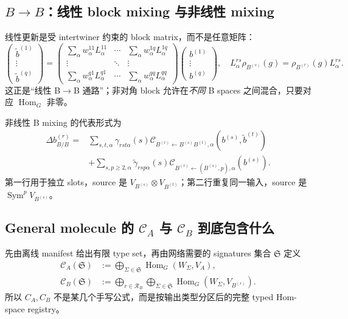 \documentclass[11pt,a4paper,fontset=fandol]{ctexart}
\newcommand{\Sym}{\operatorname{Sym}}
\newcommand{\Hom}{\operatorname{Hom}}
\newcommand{\cA}{\mathcal C_A}
\newcommand{\cB}{\mathcal C_B}
\begin{document}
\subsection{$B\to B$：线性 block mixing 与非线性 mixing}

线性更新是受 intertwiner 约束的 block matrix，而不是任意矩阵：
\begin{equation}
  \begin{pmatrix}
    \widetilde b^{(1)}\\[-.2em]\vdots\\[-.2em]\widetilde b^{(q)}
  \end{pmatrix}
  =
  \begin{pmatrix}
    \sum_\alpha w^{11}_\alpha L^{11}_\alpha&\cdots&\sum_\alpha w^{1q}_\alpha L^{1q}_\alpha\\
    \vdots&\ddots&\vdots\\
    \sum_\alpha w^{q1}_\alpha L^{q1}_\alpha&\cdots&\sum_\alpha w^{qq}_\alpha L^{qq}_\alpha
  \end{pmatrix}
  \begin{pmatrix}
    b^{(1)}\\[-.2em]\vdots\\[-.2em]b^{(q)}
  \end{pmatrix},
  \quad
  L^{rs}_\alpha\rho_{B^{(s)}}(g)
  =\rho_{B^{(r)}}(g)L^{rs}_\alpha.
  \label{eq:linear-b-b}
\end{equation}
这正是“线性 B$\to$B 通路”；非对角 block 允许在\emph{不同} B spaces 之间混合，只要对应 $\Hom_G$ 非零。

非线性 B mixing 的代表形式为
\begin{align}
  \Delta b^{(r)}_{B/B}
  =&\sum_{s,t,\alpha}
  \gamma_{rst\alpha}(s)
  \mathcal C_{B^{(r)}\leftarrow B^{(s)}B^{(t)},\alpha}
  (b^{(s)},\widetilde b^{(t)})
  \nonumber\\
  &+\sum_{s,p\ge2,\alpha}
  \widetilde\gamma_{rsp\alpha}(s)
  \mathcal C_{B^{(r)}\leftarrow(B^{(s)},p),\alpha}(b^{(s)}).
  \label{eq:nonlinear-b-b}
\end{align}
第一行用于独立 slots，source 是 $V_{B^{(s)}}\otimes V_{B^{(t)}}$；第二行重复同一输入，source 是 $\Sym^pV_{B^{(s)}}$。

\subsection{General molecule 的 $\cA$ 与 $\cB$ 到底包含什么}

先由离线 manifest 给出有限 type set，再由网络需要的 signatures 集合 $\mathfrak S$ 定义
\begin{align}
  \cA(\mathfrak S)
  &:=\bigoplus_{\Sigma\in\mathfrak S}\Hom_G(W_\Sigma,V_A),\\
  \cB(\mathfrak S)
  &:=\bigoplus_{r\in\mathcal R_B}
  \bigoplus_{\Sigma\in\mathfrak S}\Hom_G(W_\Sigma,V_{B^{(r)}}).
  \label{eq:general-banks}
\end{align}
所以 $C_A,C_B$ 不是某几个手写公式，而是按输出类型分区后的完整 typed Hom-space registry。
\end{document}
